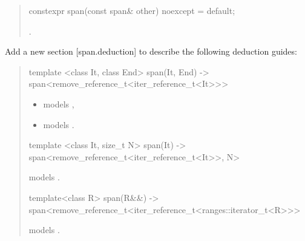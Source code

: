 \documentclass{wg21}
\begin{document}
\begin{quote}
\begin{addedblock}
\begin{itemdescr}
\end{itemdescr}
\end{addedblock}

\begin{itemdecl}
constexpr span(const span& other) noexcept = default;
\end{itemdecl}
\begin{itemdescr}
    \pnum
    \ensures
    .
\end{itemdescr}

\end{quote}


Add a new section [span.deduction] to describe the following deduction guides:


\begin{quote}
\begin{addedblock}
\begin{itemdecl}
template <class It, class End>
span(It, End) -> span<remove_reference_t<iter_reference_t<It>>>
\end{itemdecl}
\begin{itemdescr}
    \constraints
\begin{itemize}
    \item {} models ,
    \item {} models .
\end{itemize}
\end{itemdescr}

\begin{itemdecl}
template <class It, size_t N>
span(It) -> span<remove_reference_t<iter_reference_t<It>>, N>
\end{itemdecl}
\begin{itemdescr}
    \constraints {} models .
\end{itemdescr}


\begin{itemdecl}
template<class R>
span(R&&) -> span<remove_reference_t<iter_reference_t<ranges::iterator_t<R>>>
\end{itemdecl}
\begin{itemdescr}
    \constraints {} models .
\end{itemdescr}


\end{addedblock}

\end{quote}
\end{document}
